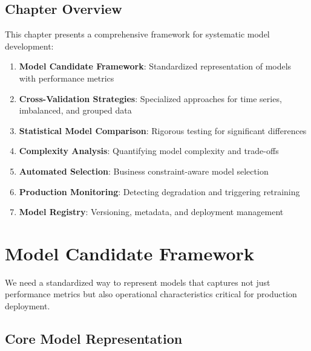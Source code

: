 \subsection{Chapter Overview}

This chapter presents a comprehensive framework for systematic model development:

\begin{enumerate}
    \item \textbf{Model Candidate Framework}: Standardized representation of models with performance metrics
    \item \textbf{Cross-Validation Strategies}: Specialized approaches for time series, imbalanced, and grouped data
    \item \textbf{Statistical Model Comparison}: Rigorous testing for significant differences
    \item \textbf{Complexity Analysis}: Quantifying model complexity and trade-offs
    \item \textbf{Automated Selection}: Business constraint-aware model selection
    \item \textbf{Production Monitoring}: Detecting degradation and triggering retraining
    \item \textbf{Model Registry}: Versioning, metadata, and deployment management
\end{enumerate}

\section{Model Candidate Framework}

We need a standardized way to represent models that captures not just performance metrics but also operational characteristics critical for production deployment.

\subsection{Core Model Representation}

